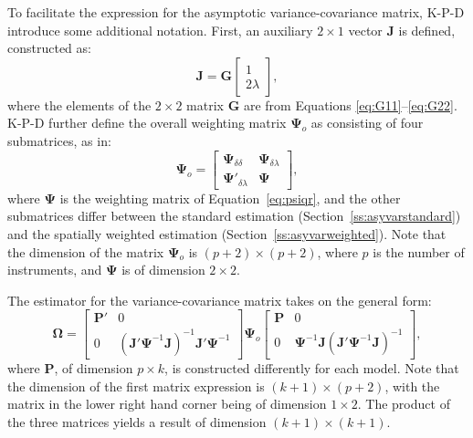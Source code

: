 \documentclass{article}
\begin{document}
To facilitate the expression for the asymptotic variance-covariance matrix,
K-P-D introduce some additional notation. First, an auxiliary $2 \times 1$ vector $\mathbf{J}$
is defined, constructed as:
\begin{equation}\label{eq:J}
\mathbf{J} = \mathbf{G}
\left[
\begin{matrix}
1 \\
2 \lambda
\end{matrix}
\right],
\end{equation}
where the elements of the $2 \times 2$ matrix $\mathbf{G}$ are from Equations
\ref{eq:G11}--\ref{eq:G22}.
K-P-D further define the overall weighting matrix $\mathbf{\mathbf{\Psi}}_o$ as consisting of four
submatrices, as in:
\begin{equation*}
\mathbf{\mathbf{\Psi}}_o =
\left[
\begin{matrix}
\mathbf{\Psi}_{\delta \delta} & \mathbf{\Psi}_{\delta \lambda}\\
\mathbf{\Psi}'_{\delta \lambda} & \mathbf{\Psi}
\end{matrix}
\right],
\end{equation*}
where $\mathbf{\Psi}$ is the weighting matrix of Equation~\ref{eq:psiqr}, and the other
submatrices differ between the standard estimation (Section~\ref{ss:asyvarstandard})
and the spatially weighted estimation (Section~\ref{ss:asyvarweighted}). Note that the 
dimension of the matrix $\mathbf{\Psi}_o$ is $(p + 2) \times (p + 2)$, where $p$ is the
number of instruments, and $\mathbf{\Psi}$ is of dimension
$2 \times 2$.

The estimator for the variance-covariance matrix takes on the general form:
\begin{equation}\label{eq:genericOmega}
\mathbf{\Omega} =
\left[
\begin{matrix}
\mathbf{P'} & 0\\
0 & (\mathbf{J'} \mathbf{\Psi}^{-1} \mathbf{J} )^{-1} \mathbf{J'} \mathbf{\Psi}^{-1} 
\end{matrix}
\right]
\mathbf{\Psi}_o
\left[
\begin{matrix}
\mathbf{P} & 0\\
0 &  \mathbf{\Psi}^{-1} \mathbf{J}  (\mathbf{J'} \mathbf{\Psi}^{-1} \mathbf{J} )^{-1}  
\end{matrix}
\right],
\end{equation}
where $\mathbf{P}$, of dimension $p \times k$, is constructed differently for each model.
Note that the dimension of the first matrix expression is $(k + 1) \times (p + 2)$, with
the matrix in the lower right hand corner being of dimension $1 \times 2$. The product
of the three matrices yields a result of dimension $(k + 1) \times (k + 1)$.
\end{document}
